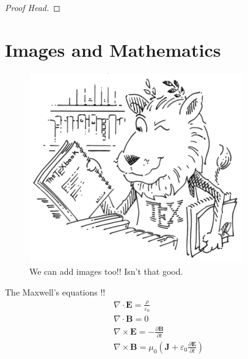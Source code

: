 \documentclass{package/notes}
\begin{document}
\begin{problem}%
	\lipsum[1][1-3] %
\end{problem}
\begin{proof}[Proof Head]
	\lipsum[1][1-10] %
\end{proof}
\nocite{knuthwebsite}

\section{Images and Mathematics}
\begin{figure}[!h]
	\centering
	\includegraphics[height = 0.5\textwidth]{resource/ctan_lion.png}
	\caption{We can add images too!! Isn't that good.}
	\label{img:anything}
\end{figure}


The Maxwell's equations !!
\[
\begin{gathered}
	\nabla \cdot \mathbf {E} ={\frac {\rho }{\varepsilon _{0}}} \\
	 \nabla \cdot \mathbf {B} ={0} \\
	\nabla \times \mathbf {E} =-{\frac {\partial \mathbf {B} }{\partial t}}\\
	 \nabla \times \mathbf {B} =\mu _{0}\left(\mathbf {J} +\varepsilon _{0}{\frac {\partial \mathbf {E} }{\partial t}}\right)
\end{gathered}
\]




\pagebreak

\medskip

\printbibliography[heading=bibintoc,title={\centering Bibliography}]
\end{document}
